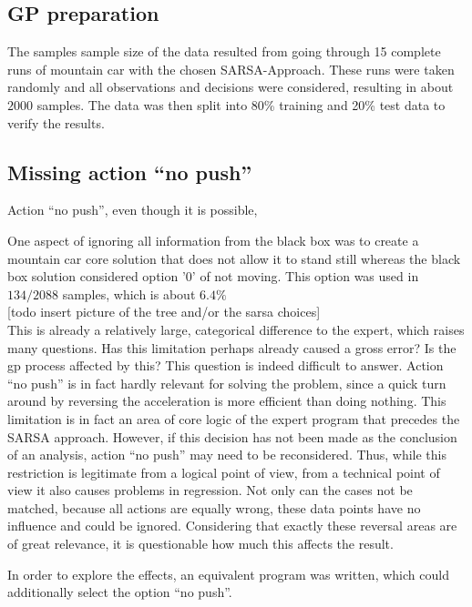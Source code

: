     


\subsection{GP preparation}
The samples sample size of the data resulted from going through 15 complete runs of mountain car with the chosen SARSA-Approach. These runs were taken randomly and all observations and decisions were considered, resulting in about $2000$ samples. The data was then split into 80\% training and 20\% test data to verify the results.\\




\subsection{Missing action ``no push''}

Action ``no push'', even though it is possible, 

One aspect of ignoring all information from the black box was to create a mountain car core solution that does not allow it to stand still whereas the black box solution considered option '0' of not moving. This option was used in $134/2088$ samples, which is about $6.4\%$\\

[todo insert picture of the tree and/or the sarsa choices]\\
This is already a relatively large, categorical difference to the expert, which raises many questions.
Has this limitation perhaps already caused a gross error? Is the gp process affected by this?
This question is indeed difficult to answer. Action ``no push'' is in fact hardly relevant for solving the problem, since a quick turn around by reversing the acceleration is more efficient than doing nothing. This limitation is in fact an area of core logic of the expert program that precedes the SARSA approach. However, if this decision has not been made as the conclusion of an analysis, action ``no push'' may need to be reconsidered.
Thus, while this restriction is legitimate from a logical point of view, from a technical point of view it also causes problems in regression. Not only can the cases not be matched, because all actions are equally wrong, these data points have no influence and could be ignored. Considering that exactly these reversal areas are of great relevance, it is questionable how much this affects the result.

In order to explore the effects, an equivalent program was written, which could additionally select the option ``no push''.


